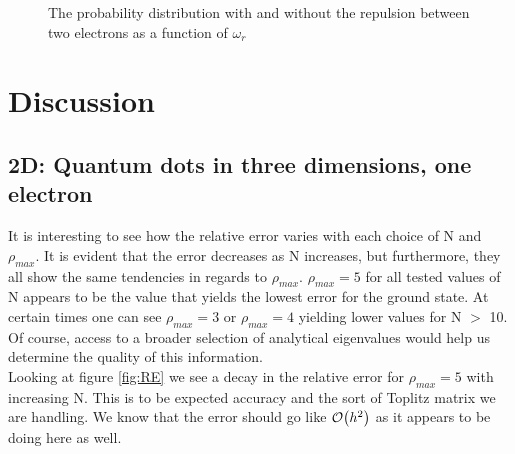 \documentclass[%
reprint,
amsmath,amssymb,
aps,
]{revtex4-1}
\begin{document}
\begin{figure}
	\centering
	\caption{The probability distribution with and without the repulsion between two electrons as a function of $\omega_r$}
\end{figure}
\section*{Discussion} 

\subsection*{2D: Quantum dots in three dimensions, one electron} \noindent 
It is interesting to see how the relative error varies with each choice of N and $\rho_{max}$. It is evident that the error decreases as N increases, but furthermore, they all show the same tendencies in regards to $\rho_{max}$. $\rho_{max} = 5$ for all tested values of N appears to be the value that yields the lowest error for the ground state. At certain times one can see $\rho_{max} = 3$ or $\rho_{max} = 4$ yielding lower values for N $>$ 10. Of course, access to a broader selection of analytical eigenvalues would help us determine the quality of this information. \\
Looking at figure \ref{fig:RE} we see a decay in the relative error for $\rho_{max} = 5$ with increasing N. This is to be expected accuracy and the sort of Toplitz matrix we are handling. We know that the error should go like $\order{h^2}$ as it appears to be doing here as well. 
\end{document}
